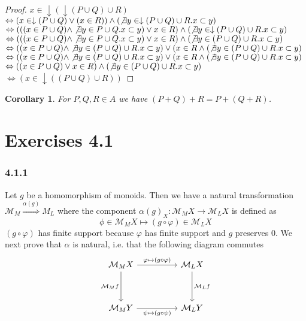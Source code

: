 \documentclass{article}
\newtheorem{corollary}{Corollary}
\begin{document}
\begin{proof}

$x \in \downarrow(\downarrow(P \cup Q) \cup R)$ \\
$\Leftrightarrow (x \in \downarrow(P \cup Q) \vee (x \in R)) \wedge (\not \exists y \in \downarrow(P \cup Q) \cup R. x \subset y)$\\
$\Leftrightarrow (((x \in P \cup Q) \wedge \not \exists y \in P \cup Q. x \subset y) \vee x \in R) \wedge (\not \exists y \in \downarrow (P \cup Q) \cup R. x \subset y)$\\
$\Leftrightarrow (((x \in P \cup Q) \wedge \not \exists y \in P \cup Q. x \subset y) \vee x \in R) \wedge (\not \exists y \in (P \cup Q) \cup R. x \subset y)$\\
$\Leftrightarrow ((x \in P \cup Q) \wedge \not \exists y \in (P \cup Q) \cup R. x \subset y) \vee (x \in R \wedge (\not \exists y \in (P \cup Q) \cup R. x \subset y)$\\
$\Leftrightarrow ((x \in P \cup Q) \wedge \not \exists y \in (P \cup Q) \cup R. x \subset y) \vee (x \in R \wedge (\not \exists y \in (P \cup Q) \cup R. x \subset y)$\\
$\Leftrightarrow ((x \in P \cup Q) \vee x \in R) \wedge (\not \exists y \in (P \cup Q) \cup R. x \subset y)$\\
$\Leftrightarrow (x \in \downarrow((P \cup Q) \cup R))$
\end{proof}

\begin{corollary}
For $P,Q,R \in A$ we have $(P + Q) + R = P + (Q + R)$.
\end{corollary}
 
\section*{Exercises 4.1}

\subsubsection*{4.1.1}

Let $g$ be a homomorphism of monoids. Then we have a natural transformation $\mathcal M_M \overset{\alpha(g)}{\Rightarrow} M_L$ where the component $\alpha(g)_X : \mathcal M_M X \to \mathcal M_L X$ is defined as $$\phi \in \mathcal M_M X \mapsto (g \circ \varphi) \in \mathcal M_L X$$
$(g \circ \varphi)$ has finite support because $\varphi$ has finite support and $g$ preserves $0$.
We next prove that $\alpha$ is natural, i.e. that the following diagram commutes
\[\begin{tikzcd}
	{\mathcal M_M X} && {\mathcal M_L X} \\
	\\
	{\mathcal M_M Y} && {\mathcal M_L Y}
	\arrow["{\mathcal M_M f}"', from=1-1, to=3-1]
	\arrow["{\mathcal M_L f}", from=1-3, to=3-3]
	\arrow["{\psi \mapsto (g \circ \psi)}"', from=3-1, to=3-3]
	\arrow["{\varphi \mapsto (g \circ \varphi)}", from=1-1, to=1-3]
\end{tikzcd}\]
\end{document}
